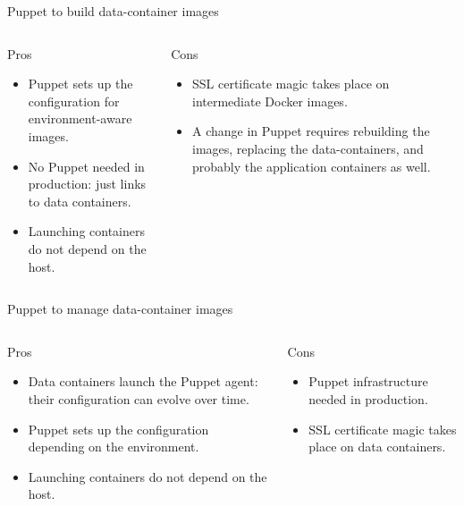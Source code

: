 \documentclass[presentation]{beamer}
\begin{document}
\begin{frame}[label=sec-6-4]{Puppet to build data-container images}
\begin{columns}
\begin{column}{0.5\textwidth}
\begin{block}{Pros}

\begin{itemize}
\item Puppet sets up the configuration for environment-aware images.
\item No Puppet needed in production: just links to data containers.
\item Launching containers do not depend on the host.
\end{itemize}
\end{block}
\end{column}

\begin{column}{0.5\textwidth}
\begin{block}{Cons}

\begin{itemize}
\item SSL certificate magic takes place on intermediate Docker images.
\item A change in Puppet requires rebuilding the images, replacing the data-containers, and probably the application containers as well.
\end{itemize}
\end{block}
\end{column}
\end{columns}
\end{frame}

\begin{frame}[label=sec-6-5]{Puppet to manage data-container images}
\begin{columns}
\begin{column}{0.5\textwidth}
\begin{block}{Pros}

\begin{itemize}
\item Data containers launch the Puppet agent: their configuration can evolve over time.
\item Puppet sets up the configuration depending on the environment.
\item Launching containers do not depend on the host.
\end{itemize}
\end{block}
\end{column}

\begin{column}{0.5\textwidth}
\begin{block}{Cons}

\begin{itemize}
\item Puppet infrastructure needed in production.
\item SSL certificate magic takes place on data containers.
\end{itemize}
\end{block}
\end{column}
\end{columns}
\end{frame}
\end{document}
